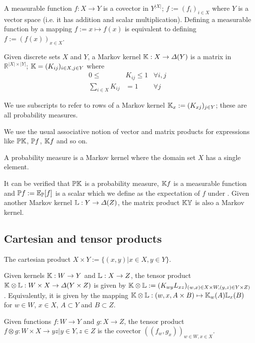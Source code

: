 A measurable function $f:X\to Y$ is a covector in $Y^{|X|}$; $f:=(f_i)_{i\in X}$ where $Y$ is a vector space (i.e. it has addition and scalar multiplication). Defining a measurable function by a mapping $f:=x\mapsto f(x)$ is equivalent to defining $f:=(f(x))_{x\in X}$.

Given discrete sets $X$ and $Y$, a Markov kernel $\mathbb{K}:X\to \Delta(Y)$ is a matrix in $\mathbb{R}^{|X|\times |Y|}$; $\mathbb{K} = (K_{ij})_{i\in X,j\in Y}$ where
\begin{align}
	0\leq &K_{ij} \leq 1 &\forall i,j\\
	\sum_{i\in X} K_{ij} &= 1 & \forall j
\end{align}

We use subscripts to refer to rows of a Markov kernel $\mathbb{K}_x:=(K_{xj})_{j\in Y}$; these are all probability measures.

We use the usual associative notion of vector and matrix products for expressions like $\mathbb{P}\mathbb{K}$, $\mathbb{P}f$, $\mathbb{K}f$ and so on.

A probability measure is a Markov kernel where the domain set $X$ has a single element.

It can be verified that $\mathbb{P}\mathbb{K}$ is a probability measure, $\mathbb{K}f$ is a measurable function and $\mathbb{P}f:=\mathbb{E}_{\mathbb{P}}[f]$ is a scalar which we define as the expectation of $f$ under . Given another Markov kernel $\mathbb{L}:Y\to \Delta(Z)$, the matrix product $\mathbb{K}\mathbb{Y}$ is also a Markov kernel.

\subsection{Cartesian and tensor products}

The cartesian product $X\times Y:=\{(x,y)|x\in X, y\in Y\}$.

Given kernels $\mathbb{K}:W\to Y$ and $\mathbb{L}:X\to Z$, the tensor product $\mathbb{K}\otimes\mathbb{L}:W\times X\to \Delta(Y\times Z)$ is given by $\mathbb{K}\otimes\mathbb{L}:=(K_{wy} L_{xz})_{(w,x)\in X\times W, (y,z)\in Y\times Z)}$. Equivalently, it is given by the mapping $\mathbb{K}\otimes\mathbb{L}:(w,x,A\times B)\mapsto \mathbb{K}_w(A)\mathbb{L}_x(B)$ for $w\in W$, $x\in X$, $A\subset Y$ and $B\subset Z$.

Given functions $f:W\to Y$ and $g:X\to Z$, the tensor product $f\otimes g:W\times X\to {yz|y\in Y, z\in Z}$ is the covector $((f_w, g_x))_{w\in W, x\in X}$.

